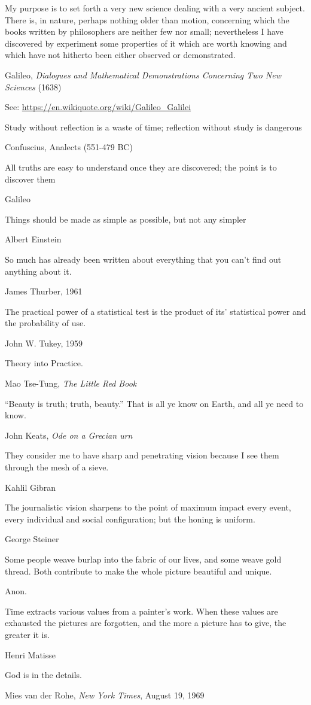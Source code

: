 \epigraph{My purpose  is to  set forth  a very  new science  dealing with  a very  ancient subject.  There  is, in  nature, perhaps  nothing older than motion, concerning which the books written by philosophers are neither few nor small;  nevertheless I have discovered by experiment some properties of it which are worth knowing and which have not hitherto been either observed or demonstrated.} {Galileo, \emph{Dialogues and Mathematical Demonstrations Concerning Two New Sciences} (1638)}
See: \url{https://en.wikiquote.org/wiki/Galileo_Galilei}

\epigraph{Study without reflection is a waste of time; reflection without study is dangerous}{Confuscius, Analects (551-479 BC)}

\epigraph{All truths are easy to understand once they are discovered; the point is to discover them}{Galileo} 

\epigraph{Things should be made as simple as possible, but not any simpler}{Albert Einstein}

\epigraph{So much has already been written about everything that you can't find out anything about it.}{James Thurber, 1961}

\epigraph{The practical power of a statistical test is the product of its' statistical power and the probability of use.}{John W. Tukey, 1959 \citep{Tukey:59}}

\epigraph{Theory into Practice.}{Mao Tse-Tung, \emph{The Little Red Book}}

\epigraph{``Beauty is truth; truth, beauty.'' That is all ye know on Earth, and all ye need to know.}{John Keats, \emph{Ode on a Grecian urn}}

\epigraph{They consider me to have sharp and penetrating vision because I see them through the mesh of a sieve.}{Kahlil Gibran}

\epigraph{The journalistic vision sharpens to the point of maximum impact every event, every individual and social configuration; but the honing is uniform.}{George Steiner}

\epigraph{Some people weave burlap into the fabric of our lives, and some weave gold thread. Both contribute to make the whole picture beautiful and unique.}{Anon.}

\epigraph{Time extracts various values from a painter's work. When these values are exhausted the pictures are forgotten, and the more a picture has to give, the greater it is.}{Henri Matisse}

\epigraph{God is in the details.}{Mies van der Rohe, \emph{New York Times}, August 19, 1969}

